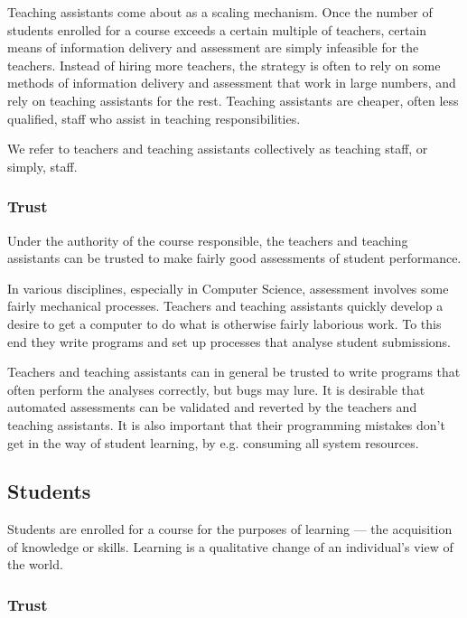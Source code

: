 Teaching assistants come about as a scaling mechanism. Once the number of
students enrolled for a course exceeds a certain multiple of teachers, certain
means of information delivery and assessment are simply infeasible for the
teachers. Instead of hiring more teachers, the strategy is often to rely on
some methods of information delivery and assessment that work in large numbers,
and rely on teaching assistants for the rest. Teaching assistants are cheaper,
often less qualified, staff who assist in teaching responsibilities.

We refer to teachers and teaching assistants collectively as teaching staff, or
simply, staff.

\subsubsection{Trust}

Under the authority of the course responsible, the teachers and teaching
assistants can be trusted to make fairly good assessments of student
performance.

In various disciplines, especially in Computer Science, assessment involves
some fairly mechanical processes. Teachers and teaching assistants quickly
develop a desire to get a computer to do what is otherwise fairly laborious
work. To this end they write programs and set up processes that analyse student
submissions.

Teachers and teaching assistants can in general be trusted to write programs
that often perform the analyses correctly, but bugs may lure. It is desirable
that automated assessments can be validated and reverted by the teachers and
teaching assistants. It is also important that their programming mistakes don't
get in the way of student learning, by e.g. consuming all system resources.

\subsection{Students}

Students are enrolled for a course for the purposes of learning --- the
acquisition of knowledge or skills. Learning is a qualitative change of an
individual's view of the world\cite{ramsden-1992}.

\subsubsection{Trust}

